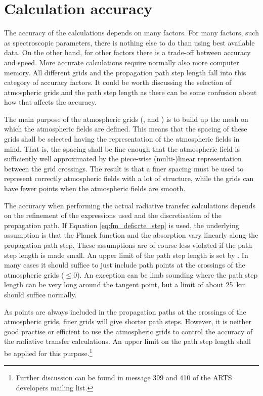 \section{Calculation accuracy}
\label{sec:fm_defs:accuracy}

The accuracy of the calculations depends on many factors. For many
factors, such as spectroscopic parameters, there is nothing else to do
than using best available data. On the other hand, for other factors
there is a trade-off between accuracy and speed. More accurate
calculations require normally also more computer memory. All
different grids and the propagation path step length fall into this
category of accuracy factors. It could be worth discussing the
selection of atmospheric grids and the path step length as there can
be some confusion about how that affects the accuracy.

The main purpose of the atmospheric grids (,
 and ) is to build up the
mesh on which the atmospheric fields are defined. This means that the
spacing of these grids shall be selected having the representation of
the atmospheric fields in mind. That is, the spacing shall be fine
enough that the atmospheric field is sufficiently well approximated by
the piece-wise (multi-)linear representation between the grid
crossings. The result is that a finer spacing must be used to
represent correctly atmospheric fields with a lot of structure, while
the grids can have fewer points when the atmospheric fields are
smooth. 

The accuracy when performing the actual radiative transfer calculations depends
on the refinement of the expressions used and the discretisation of the
propagation path. If Equation \ref{eq:fm_defs:rte_step} is used, the
underlying assumption is that the Planck function and the absorption vary
linearly along the propagation path step. These assumptions are of course less
violated if the path step length is made small. An upper limit of the path step
length is set by . In many cases it should suffice to
just include path points at the crossings of the atmospheric grids
($\leq0$). An exception can be limb sounding where the
path step length can be very long around the tangent point, but a limit of
about 25~km should suffice normally.

As points are always included in the propagation paths at the
crossings of the atmospheric grids, finer grids will give shorter path
steps. However, it is neither good practise or efficient to use the
atmospheric grids to control the accuracy of the radiative transfer
calculations. An upper limit on the path step length shall be applied
for this purpose.\footnote{Further discussion can be found in message
  399 and 410 of the ARTS developers mailing list.}



